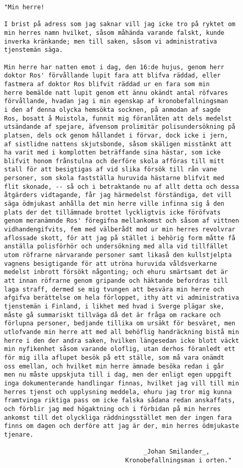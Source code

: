\begin{verbatim}
"Min herre!

I brist på adress som jag saknar vill jag icke tro på ryktet om
min herres namn hvilket, såsom måhända varande falskt, kunde
inverka kränkande; men till saken, såsom vi administrativa
tjenstemän säga.

Min herre har natten emot i dag, den 16:de hujus, genom herr
doktor Ros' förvållande lupit fara att blifva räddad, eller
fastmera af doktor Ros blifvit räddad ur en fara som min
herre bemälde natt lupit genom ett ännu okändt antal röfvares
förvållande, hvadan jag i min egenskap af kronobefallningsman
i den af denna olycka hemsökta socknen, på anmodan af sagde
Ros, bosatt å Muistola, funnit mig föranlåten att dels medelst
utsändande af spejare, äfvensom prolimitär polisundersökning på
platsen, dels ock genom hållandet i förvar, dock icke i jern,
af sistlidne nattens skjutsbonde, såsom skäligen misstänkt att
ha varit med i komplotten beträffande sina hästar, som icke
blifvit honom frånstulna och derföre skola afföras till mitt
stall för att besigtigas af vid slika försök till rån vane
personer, som skola fastställa huruvida hästarne blifvit med
flit skonade, -- så och i betraktande nu af allt detta och dessa
åtgärders vidtagande, får jag härmedelst förständiga, det vill
säga ödmjukast anhålla det min herre ville infinna sig å den
plats der det tillämnade brottet lyckligtvis icke föröfvats
genom meranämnde Ros' föregifna mellankomst och såsom af vittnen
vidhandengifvits, fem med välberådt mod ur min herres revolvrar
aflossade skott, för att jag på stället i behörig form måtte få
anställa polisförhör och undersökning med alla vid tillfället
utom röfrarne närvarande personer samt likaså den kullstjelpta
vagnens besigtigande för att utröna huruvida våldsverkarne
medelst inbrott försökt någonting; och ehuru smärtsamt det är
att innan röfrarne genom gripande och häktande befordras till
laga straff, dermed se mig tvungen att besvära min herre och
afgifva berättelse om hela förloppet, ithy att vi administrativa
tjenstemän i Finland, i likhet med hvad i Sverge plägar ske,
måste gå summariskt tillväga då det är fråga om rackare och
förlupna personer, bedjande tillika om ursäkt för besväret, men
utlofvande min herre att med all behöflig handräckning bistå min
herre i den der andra saken, hvilken längesedan icke blott väckt
min nyfikenhet såsom varande oloflig, utan derhos föranledt ett
för mig illa aflupet besök på ett ställe, som må vara onämdt
oss emellan, och hvilket min herre ämnade besöka redan i går
men nu måste uppskjuta till i dag, men der enligt egen uppgift
inga dokumenterande handlingar finnas, hvilket jag vill till min
herres tjenst och upplysning meddela, ehuru jag tror mig kunna
framtvinga riktiga pass om icke falska sådana redan anskaffats,
och förblir jag med högaktning och i förbidan på min herres
ankomst till det olyckliga räddningsstället men der ingen fara
finns om dagen och derföre att jag är der, min herres ödmjukaste
tjenare.

                                      _Johan Smilander_,
                                 Kronobefallningsman i orten."
\end{verbatim}


